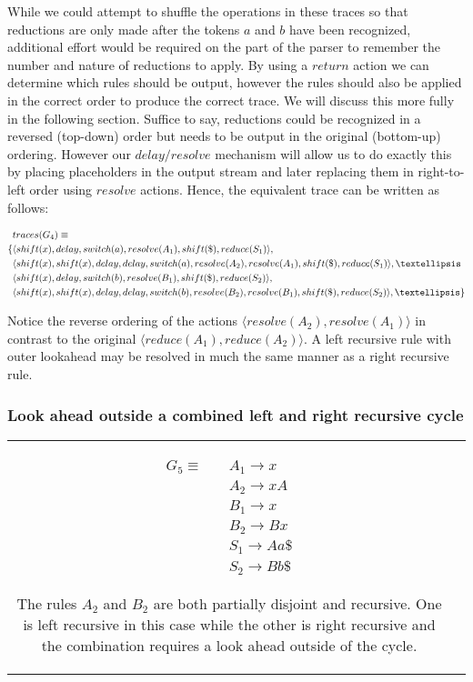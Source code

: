 \documentclass[a4paper,11pt]{article}
\begin{document}
While we could attempt to shuffle the operations in these traces so that reductions are only made after the tokens $a$ and $b$ have been recognized, 
additional effort would be required on the part of the parser to remember the number and nature of reductions to apply. 
By using a $return$ action we can determine which rules should be output, however the rules should also be applied in the correct order to produce the correct trace. 
We will discuss this more fully in the following section.
Suffice to say, reductions could be recognized in a reversed (top-down) order but needs to be output in the original (bottom-up) ordering.
However our $delay/resolve$ mechanism will allow us to do exactly this by placing placeholders in the output stream and later replacing them in right-to-left order using $resolve$ actions.
Hence, the equivalent trace can be written as follows:

{\small\parbox{.3\textwidth}{\begin{align*}
&traces(G_4) \equiv \\
\{ & \langle shift(x), delay, switch(a), resolve(A_1), shift(\$), reduce(S_1) \rangle,\\
   & \langle shift(x), shift(x), delay, delay, switch(a), resolve(A_2), resolve(A_1), shift(\$), reduce(S_1) \rangle, \textellipsis \\
   & \langle shift(x), delay, switch(b), resolve(B_1), shift(\$), reduce(S_2) \rangle,\\
   & \langle shift(x), shift(x), delay, delay, switch(b), resolve(B_2), resolve(B_1), shift(\$), reduce(S_2) \rangle, \textellipsis \}
\end{align*}}}

Notice the reverse ordering of the actions $\langle resolve(A_2), resolve(A_1) \rangle$ in contrast to the original $\langle reduce(A_1), reduce(A_2) \rangle$.
A left recursive rule with outer lookahead may be resolved in much the same manner as a right recursive rule.

\subsubsection{Look ahead outside a combined left and right recursive cycle}
\begin{tabular}[t]{cl}
\parbox{.3\textwidth}{
\begin{align*}
G_5 \equiv \quad & A_1 \rightarrow x\\
                 & A_2 \rightarrow x A\\
                 & B_1 \rightarrow x\\
                 & B_2 \rightarrow B x\\
                 & S_1 \rightarrow A a \$\\
                 & S_2 \rightarrow B b \$
\end{align*}}
\parbox{.6\textwidth}{The rules $A_2$ and $B_2$ are both partially disjoint and recursive. One is left recursive in this case while the other is right recursive and the combination
requires a look ahead outside of the cycle.}
\end{tabular}
\end{document}
